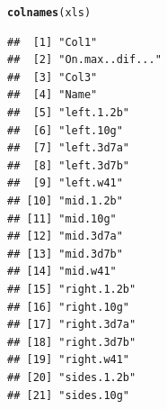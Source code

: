 \documentclass[12pt, a4paper]{article}\usepackage[]{graphicx}\usepackage[]{color}
\makeatletter
\newcommand{\hlstd}[1]{\textcolor[rgb]{0.345,0.345,0.345}{#1}}%
\newcommand{\hlkwd}[1]{\textcolor[rgb]{0.737,0.353,0.396}{\textbf{#1}}}%
\newenvironment{kframe}{%
 \def\at@end@of@kframe{}%
 \ifinner\ifhmode%
  \def\at@end@of@kframe{\end{minipage}}%
  \begin{minipage}{\columnwidth}%
 \fi\fi%
 \def\FrameCommand##1{\hskip\@totalleftmargin \hskip-\fboxsep
 \colorbox{shadecolor}{##1}\hskip-\fboxsep
     \hskip-\linewidth \hskip-\@totalleftmargin \hskip\columnwidth}%
 \MakeFramed {\advance\hsize-\width
   \@totalleftmargin\z@ \linewidth\hsize
   \@setminipage}}%
 {\par\unskip\endMakeFramed%
 \at@end@of@kframe}
\newenvironment{knitrout}{}{} %
\makeatother
\begin{document}
\begin{knitrout}
\begin{kframe}
{\ttfamily\noindent\color{warningcolor}{\#\# Warning: Error detected in cell AQ5267 - Incompatible type}}\begin{alltt}
\hlkwd{colnames}\hlstd{(xls)}
\end{alltt}
\begin{verbatim}
##  [1] "Col1"                                                                                                  
##  [2] "On.max..dif..."                                                                                        
##  [3] "Col3"                                                                                                  
##  [4] "Name"                                                                                                  
##  [5] "left.1.2b"                                                                                             
##  [6] "left.10g"                                                                                              
##  [7] "left.3d7a"                                                                                             
##  [8] "left.3d7b"                                                                                             
##  [9] "left.w41"                                                                                              
## [10] "mid.1.2b"                                                                                              
## [11] "mid.10g"                                                                                               
## [12] "mid.3d7a"                                                                                              
## [13] "mid.3d7b"                                                                                              
## [14] "mid.w41"                                                                                               
## [15] "right.1.2b"                                                                                            
## [16] "right.10g"                                                                                             
## [17] "right.3d7a"                                                                                            
## [18] "right.3d7b"                                                                                            
## [19] "right.w41"                                                                                             
## [20] "sides.1.2b"                                                                                            
## [21] "sides.10g"                                                                                             

\end{verbatim}
\end{kframe}
\end{knitrout}
\end{document}
